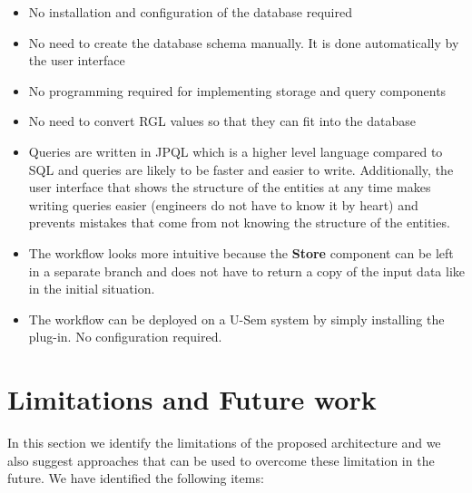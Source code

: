 \begin{itemize}
	\item No installation and configuration of the database required
	\item No need to create the database schema manually. It is done automatically by the user interface
	\item No programming required for implementing storage and query components
	\item No need to convert RGL values so that they can fit into the database
	\item Queries are written in JPQL which is a higher level language compared to SQL and queries are likely to be faster and easier to write. Additionally, the user interface that shows the structure of the entities at any time makes writing queries easier (engineers do not have to know it by heart) and prevents mistakes that come from not knowing the structure of the entities. 
	\item The workflow looks more intuitive because the  \textbf{Store} component can be left in a separate branch and does not have to return a copy of the input data like in the initial situation.
	\item The workflow can be deployed on a U-Sem system by simply installing the plug-in. No configuration required.
\end{itemize}


\section{Limitations and Future work}
\label{sec:limitsStorage}

In this section we identify the limitations of the proposed architecture and we also suggest approaches that can be used to overcome these limitation in the future. We have identified the following items:

